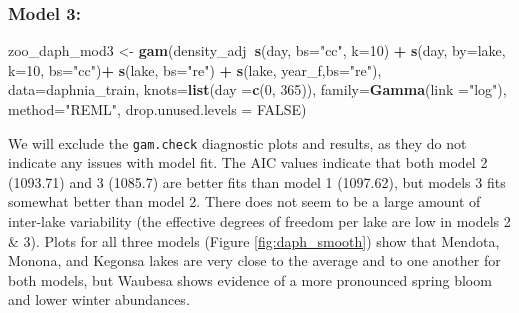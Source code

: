 \documentclass[12pt]{article}
\newenvironment{Shaded}{\begin{snugshade}}{\end{snugshade}}
\newcommand{\KeywordTok}[1]{\textcolor[rgb]{0.13,0.29,0.53}{\textbf{#1}}}
\newcommand{\DataTypeTok}[1]{\textcolor[rgb]{0.13,0.29,0.53}{#1}}
\newcommand{\DecValTok}[1]{\textcolor[rgb]{0.00,0.00,0.81}{#1}}
\newcommand{\StringTok}[1]{\textcolor[rgb]{0.31,0.60,0.02}{#1}}
\newcommand{\OtherTok}[1]{\textcolor[rgb]{0.56,0.35,0.01}{#1}}
\newcommand{\OperatorTok}[1]{\textcolor[rgb]{0.81,0.36,0.00}{\textbf{#1}}}
\newcommand{\NormalTok}[1]{#1}
\begin{document}
\subsubsection{Model 3:}\label{model-3}

\begin{Shaded}
\begin{Highlighting}[]
\NormalTok{zoo_daph_mod3 <-}\StringTok{ }\KeywordTok{gam}\NormalTok{(density_adj}\OperatorTok{~}\KeywordTok{s}\NormalTok{(day, }\DataTypeTok{bs=}\StringTok{"cc"}\NormalTok{, }\DataTypeTok{k=}\DecValTok{10}\NormalTok{) }\OperatorTok{+}
\StringTok{                             }\KeywordTok{s}\NormalTok{(day, }\DataTypeTok{by=}\NormalTok{lake, }\DataTypeTok{k=}\DecValTok{10}\NormalTok{, }\DataTypeTok{bs=}\StringTok{"cc"}\NormalTok{)}\OperatorTok{+}
\StringTok{                             }\KeywordTok{s}\NormalTok{(lake, }\DataTypeTok{bs=}\StringTok{"re"}\NormalTok{) }\OperatorTok{+}\StringTok{ }
\StringTok{                             }\KeywordTok{s}\NormalTok{(lake, year_f,}\DataTypeTok{bs=}\StringTok{"re"}\NormalTok{),}
                     \DataTypeTok{data=}\NormalTok{daphnia_train,}
                     \DataTypeTok{knots=}\KeywordTok{list}\NormalTok{(}\DataTypeTok{day =}\KeywordTok{c}\NormalTok{(}\DecValTok{0}\NormalTok{, }\DecValTok{365}\NormalTok{)),}
                     \DataTypeTok{family=}\KeywordTok{Gamma}\NormalTok{(}\DataTypeTok{link =}\StringTok{"log"}\NormalTok{),}
                     \DataTypeTok{method=}\StringTok{"REML"}\NormalTok{,}
                     \DataTypeTok{drop.unused.levels =} \OtherTok{FALSE}\NormalTok{)}
\end{Highlighting}
\end{Shaded}

We will exclude the \texttt{gam.check} diagnostic plots and results, as
they do not indicate any issues with model fit. The AIC values indicate
that both model 2 (1093.71) and 3 (1085.7) are better fits than model 1
(1097.62), but models 3 fits somewhat better than model 2. There does
not seem to be a large amount of inter-lake variability (the effective
degrees of freedom per lake are low in models 2 \& 3). Plots for all
three models (Figure \ref{fig:daph_smooth}) show that Mendota, Monona,
and Kegonsa lakes are very close to the average and to one another for
both models, but Waubesa shows evidence of a more pronounced spring
bloom and lower winter abundances.
\end{document}
